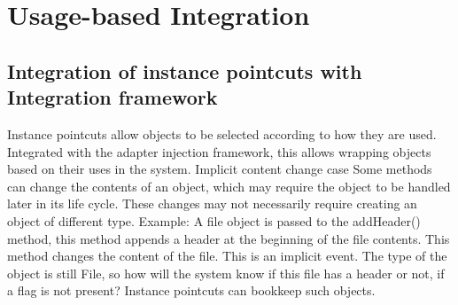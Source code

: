 \chapter{Usage-based Integration}
\section{Integration of instance pointcuts with Integration framework}
Instance pointcuts allow objects to be selected according to how they are used. Integrated with the adapter injection framework, this allows wrapping objects based on their uses in the system.
Implicit content change case
Some methods can change the contents of an object, which may require the object to be handled later in its life cycle. These changes may not necessarily require creating an object of different type.
Example: A file object is passed to the addHeader() method, this method appends a header at the beginning of the file contents. This method changes the content of the file. This is an implicit event. The type of the object is still File, so how will the system know if this file has a header or not, if a flag is not present? Instance pointcuts can bookkeep such objects.